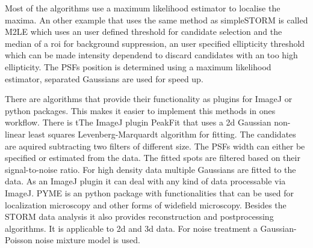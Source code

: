 Most of the algorithms use a maximum likelihood estimator to localise the maxima. An other example that uses the same method as simpleSTORM is called M2LE \cite{M2LE} which uses an user defined threshold for candidate selection and the median of a roi for background suppression, an user specified ellipticity threshold which can be made intensity dependend to discard candidates with an too high ellipticity. The PSFs position is determined using a maximum likelihood estimator, separated Gaussians are used for speed up. \newline

There are algorithms that provide their functionality as plugins for ImageJ or python packages. This makes it easier to implement this methods in ones workflow.\newline
There is tThe ImageJ plugin PeakFit \cite{peakFit} that uses a 2d Gaussian non-linear least squares Levenberg-Marquardt algorithm for fitting. The candidates are aquired subtracting two filters of different size. The PSFs width can either be specified or estimated from the data. The fitted spots are filtered based on their signal-to-noise ratio. For high density data multiple Gaussians are fitted to the data. As an ImageJ plugin it can deal with any kind of data processable via ImageJ.\newline
PYME \cite{PYME} is an python package with functionalities that can be used for localization microscopy and other forms of widefield microscopy. Besides the STORM data analysis it also provides reconstruction and postprocessing algorithms. It is applicable to 2d and 3d data. For noise treatment a Gaussian-Poisson noise mixture model is used.\newline

